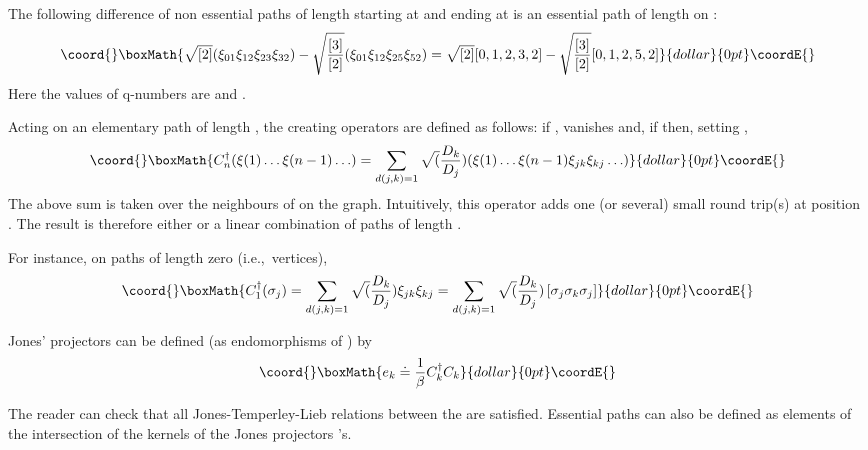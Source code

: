 \documentclass[a4paper,11pt]{article}
\def\ie{{\rm i.e.,\/}\ }
\begin{document}
The following difference of non essential paths of length \coordHE{}
starting at \coordHE{} and ending at \coordHE{}
is an essential path of length \coordHE{}  on \coordHE{}:
$$\coord{}\boxMath{\sqrt{[2]} (\xi_{01}\xi_{12}\xi_{23}\xi_{32})  - \sqrt
\frac{[3]}{[2]} (\xi_{01}\xi_{12}\xi_{25}\xi_{52})
= \sqrt {[2]}  [0,1,2,3,2]- \sqrt \frac{[3]}{[2]}[0,1,2,5,2]}{dollar}{0pt}\coordE{}$$
Here the values of q-numbers are \coordHE{} and \coordHE{}.

Acting on an elementary path of length \coordHE{}, the creating operators
\coordHE{} are defined as follows:
if \coordHE{}, \coordHE{} vanishes and, if \coordHE{} then,
setting \coordHE{},
$$\coord{}\boxMath{
C^{\dag}_{n} (\xi(1)\ldots\xi(n-1)\ldots) = \sum_{d(j,k)=1}
\sqrt(\frac{D_{k}}{D_{j}})  (\xi(1)\ldots\xi(n-1)\xi_{jk}\xi_{kj}\ldots)
}{dollar}{0pt}\coordE{}$$
The above sum is taken over the neighbours \coordHE{} of
\coordHE{} on the graph.
Intuitively, this operator adds one  (or several) small round trip(s)
at position \coordHE{}.
The result is therefore either \coordHE{} or a linear combination of paths of
length \coordHE{}.

For instance, on paths of length zero (\ie vertices),
$$\coord{}\boxMath{
C^{\dag}_{1} (\sigma_{j}) = \sum_{d(j,k)=1}
\sqrt(\frac{D_{k}}{D_{j}}) \xi_{jk}\xi_{kj} = \sum_{d(j,k)=1}
\sqrt(\frac{D_{k}}{D_{j}}) \, [\sigma_{j}\sigma_{k}\sigma_{j}]
}{dollar}{0pt}\coordE{}$$

Jones' projectors \coordHE{} can be defined (as endomorphisms of
\coordHE{}) by
$$\coord{}\boxMath{
e_{k} \doteq \frac{1}{\beta} C^{\dag}_{k} C_{k}
}{dollar}{0pt}\coordE{}$$

The reader can check that all Jones-Temperley-Lieb relations
between the \coordHE{} are satisfied.
Essential paths can also be defined as elements of the intersection of the
kernels of the Jones projectors \coordHE{}'s.


\end{document}
